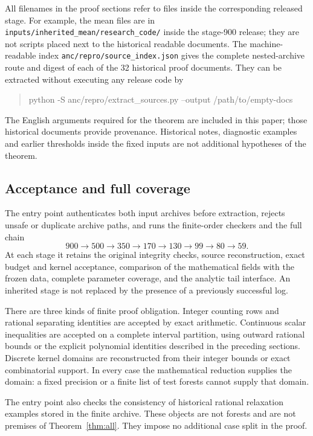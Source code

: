 All filenames in the proof sections refer to files inside the
corresponding released stage. For example, the mean files are in
\nolinkurl{inputs/inherited_mean/research_code/} inside the stage-900
release; they are not scripts placed next to the historical readable
documents. The machine-readable index
\nolinkurl{anc/repro/source_index.json} gives the complete nested-archive
route and digest of each of the 32 historical proof documents. They can
be extracted without executing any release code by
\begin{quote}\small\ttfamily
python -S anc/repro/extract\_sources.py --output /path/to/empty-docs
\end{quote}
The English arguments required for the theorem are included in this
paper; those historical documents provide provenance. Historical notes,
diagnostic examples and earlier thresholds inside the fixed inputs are
not additional hypotheses of the theorem.

\subsection{Acceptance and full coverage}
The entry point authenticates both input archives before extraction,
rejects unsafe or duplicate archive paths, and runs the finite-order
checkers and the full chain
\[
 900\longrightarrow500\longrightarrow350\longrightarrow170
 \longrightarrow130\longrightarrow99\longrightarrow80
 \longrightarrow59.
\]
At each stage it retains the original integrity checks, source
reconstruction, exact budget and kernel acceptance, comparison of the
mathematical fields with the frozen data, complete parameter coverage,
and the analytic tail interface. An inherited stage is not replaced by
the presence of a previously successful log.

There are three kinds of finite proof obligation. Integer counting rows
and rational separating identities are accepted by exact arithmetic.
Continuous scalar inequalities are accepted on a complete interval
partition, using outward rational bounds or the explicit polynomial
identities described in the preceding sections. Discrete kernel
domains are reconstructed from their integer bounds or exact
combinatorial support. In every case the mathematical reduction supplies
the domain: a fixed precision or a finite list of test forests cannot
supply that domain.

The entry point also checks the consistency of historical rational
relaxation examples stored in the finite archive. These objects are not
forests and are not premises of Theorem~\ref{thm:all}. They impose no
additional case split in the proof.

